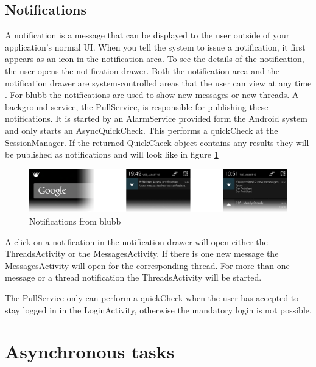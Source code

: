 \documentclass[12pt,a4paper,oneside]{report}
\newcommand{\appname}{blubb}
\begin{document}
\subsection{Notifications} \label{subsec:notifications}
A notification is a message that can be displayed to the user outside of your application's normal UI. When you tell the system to issue a notification, it first appears as an icon in the notification area. To see the details of the notification, the user opens the notification drawer. Both the notification area and the notification drawer are system-controlled areas that the user can view at any time \citep{aDefNotifications}.
For \appname{} the notifications are used to show new messages or new threads. A background service, the PullService, is responsible for publishing these notifications. It is started by an AlarmService provided form the Android system and only starts an AsyncQuickCheck. This performs a quickCheck at the SessionManager. If the returned QuickCheck object contains any results they will be published as notifications and will look like in figure \ref{fig:notifications}

\begin{figure}[!ht]
    \includegraphics[width=\linewidth]{Notification.png}
	\caption{Notifications from \appname{}} 
	\label{fig:notifications}
\end{figure}

A click on a notification in the notification drawer will open either the ThreadsActivity or the MessagesActivity. If there is one new message the MessagesActivity will open for the corresponding thread. For more than one message or a thread notification the ThreadsActivity will be started.

The PullService only can perform a quickCheck when the user has accepted to stay logged in in the LoginActivity, otherwise the mandatory login is not possible.

\section{Asynchronous tasks} \label{sec:AsyncTasks}
\end{document}
